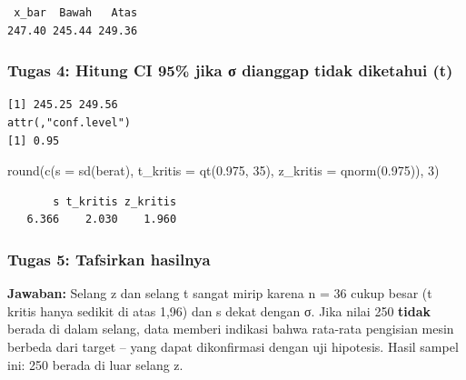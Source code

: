 \documentclass[
  indonesian,
  letterpaper,
]{book}
\newenvironment{Shaded}{\begin{snugshade}}{\end{snugshade}}
\newcommand{\AttributeTok}[1]{\textcolor[rgb]{0.40,0.45,0.13}{#1}}
\newcommand{\DecValTok}[1]{\textcolor[rgb]{0.68,0.00,0.00}{#1}}
\newcommand{\FloatTok}[1]{\textcolor[rgb]{0.68,0.00,0.00}{#1}}
\newcommand{\FunctionTok}[1]{\textcolor[rgb]{0.28,0.35,0.67}{#1}}
\newcommand{\NormalTok}[1]{\textcolor[rgb]{0.00,0.23,0.31}{#1}}
\newcommand{\SpecialCharTok}[1]{\textcolor[rgb]{0.37,0.37,0.37}{#1}}
\begin{document}
\begin{verbatim}
 x_bar  Bawah   Atas 
247.40 245.44 249.36 
\end{verbatim}

\subsubsection{Tugas 4: Hitung CI 95\% jika σ dianggap tidak diketahui
(t)}\label{tugas-4-hitung-ci-95-jika-ux3c3-dianggap-tidak-diketahui-t}

\begin{Shaded}
\end{Shaded}

\begin{verbatim}
[1] 245.25 249.56
attr(,"conf.level")
[1] 0.95
\end{verbatim}

\begin{Shaded}
\begin{Highlighting}[]
\FunctionTok{round}\NormalTok{(}\FunctionTok{c}\NormalTok{(}\AttributeTok{s =} \FunctionTok{sd}\NormalTok{(berat), }\AttributeTok{t\_kritis =} \FunctionTok{qt}\NormalTok{(}\FloatTok{0.975}\NormalTok{, }\DecValTok{35}\NormalTok{), }\AttributeTok{z\_kritis =} \FunctionTok{qnorm}\NormalTok{(}\FloatTok{0.975}\NormalTok{)), }\DecValTok{3}\NormalTok{)}
\end{Highlighting}
\end{Shaded}

\begin{verbatim}
       s t_kritis z_kritis 
   6.366    2.030    1.960 
\end{verbatim}

\subsubsection{Tugas 5: Tafsirkan
hasilnya}\label{tugas-5-tafsirkan-hasilnya}

\textbf{Jawaban:} Selang z dan selang t sangat mirip karena n = 36 cukup
besar (t kritis hanya sedikit di atas 1,96) dan s dekat dengan σ. Jika
nilai 250 \textbf{tidak} berada di dalam selang, data memberi indikasi
bahwa rata-rata pengisian mesin berbeda dari target -- yang dapat
dikonfirmasi dengan uji hipotesis. Hasil sampel ini: 250 berada di luar
selang z.
\end{document}

